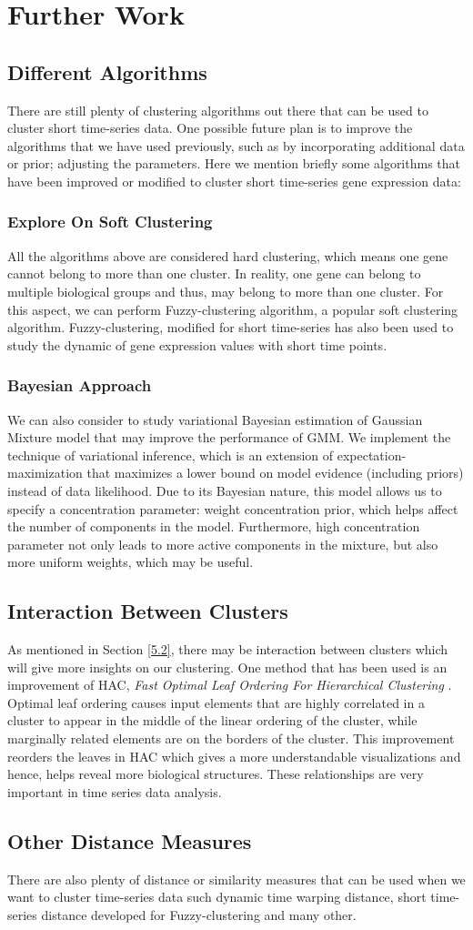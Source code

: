 \section{Further Work}
\subsection{Different Algorithms}
There are still plenty of clustering algorithms out there that can be used to cluster short time-series data. One possible future plan is to improve the algorithms that we have used previously, such as by incorporating additional data or prior; adjusting the parameters. Here we mention briefly some algorithms that have been improved or modified to cluster short time-series gene expression data:
\subsubsection{Explore On Soft Clustering}
All the algorithms above are considered hard clustering, which means one gene cannot belong to more than one cluster. In reality, one gene can belong to multiple biological groups and thus, may belong to more than one cluster. For this aspect, we can perform Fuzzy-clustering algorithm, a popular soft clustering algorithm. Fuzzy-clustering, modified for short time-series \cite{Moller-Levet2003} has also been used to study the dynamic of gene expression values with short time points. 
\subsubsection{Bayesian Approach}
We can also consider to study variational Bayesian estimation of Gaussian Mixture model \cite{Jia2008} that may improve the performance of GMM. We implement the technique of variational inference, which is an extension of expectation-maximization that maximizes a lower bound on model evidence (including priors) instead of data likelihood. Due to its Bayesian nature, this model allows us to specify a concentration parameter: weight concentration prior, which helps affect the number of components in the model. Furthermore, high concentration parameter not only leads to more active components in the mixture, but also more uniform weights, which may be useful.
\subsection{Interaction Between Clusters}
As mentioned in Section \ref{5.2}, there may be interaction between clusters which will give more insights on our clustering. One method that has been used is an improvement of HAC, \textit{Fast Optimal Leaf Ordering For Hierarchical Clustering} \cite{fasthac}. Optimal leaf ordering causes input elements that are highly correlated in a cluster to appear in the middle of the linear ordering of the cluster, while marginally related elements are on the borders of the cluster. This improvement reorders the leaves in HAC which gives a more understandable visualizations and hence, helps reveal more biological structures. These relationships are very important in time series data analysis. 
\subsection{Other Distance Measures}
There are also plenty of distance or similarity measures that can be used when we want to cluster time-series data such dynamic time warping distance, short time-series distance developed for Fuzzy-clustering \cite{Moller-Levet2003} and many other. 

